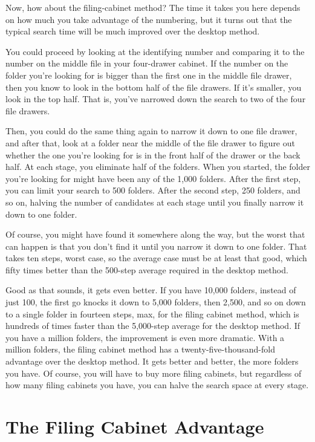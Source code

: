 Now, how about the filing-cabinet method? The time it takes you here
depends on how much you take advantage of the numbering, but it
turns out that the typical search time will be much improved over
the desktop method.

You could proceed by looking at
the identifying number and comparing it to the number on the middle
file in your four-drawer cabinet.
If the number on the folder you're looking for is bigger than the first one in
the middle file drawer, then you know to look in the bottom half of the
file drawers. If it's smaller, you look in the top half.
That is, you've narrowed down the search to two of the four file drawers.

Then, you could do the same thing again to narrow it down to one file drawer,
and after that, look at a folder near the middle of the file drawer
to figure out whether the one you're looking for is in the front half
of the drawer or the back half.
At each stage, you eliminate half of the folders.
When you started, the folder you're looking for might have been any
of the 1,000 folders. After the first step, you can limit your search
to 500 folders. After the second step, 250 folders, and so on,
halving the number of candidates at each stage until you finally
narrow it down to one folder.

Of course, you might have found it somewhere along the way,
but the worst that can happen is that you don't find it until you
narrow it down to one folder. That takes ten steps, worst case, so
the average case must be at least that good, which
fifty times better than the 500-step average required in the desktop method.

Good as that sounds, it gets even better. If you have 10,000 folders,
instead of just 100, the first go knocks it down to 5,000 folders,
then 2,500, and so on down to a single folder in fourteen steps, max,
for the filing cabinet method, which is hundreds of times faster
than the 5,000-step average for the desktop method.
If you have a million
folders, the improvement is even more dramatic. With a million
folders, the filing cabinet method has a twenty-five-thousand-fold
advantage over the desktop method. It gets better and better, the
more folders you have. Of course, you will have to buy more filing
cabinets, but regardless of how many filing cabinets you have,
you can halve the search space at every stage.

\section{The Filing Cabinet Advantage}

